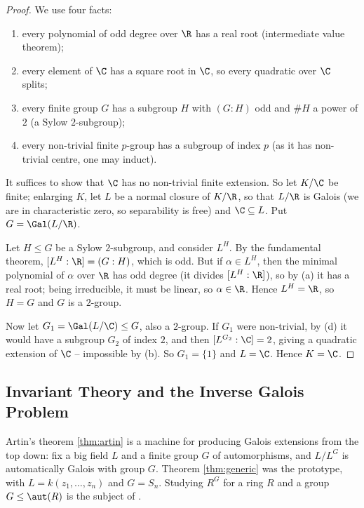 \begin{proof}
	We use four facts:
	\begin{enumerate}[label=(\alph*)]
		\item every polynomial of odd degree over $\R$ has a real root (intermediate value theorem);
		\item every element of $\C$ has a square root in $\C$, so every quadratic over $\C$ splits;
		\item every finite group $G$ has a subgroup $H$ with $(G:H)$ odd and $\#H$ a power of $2$ (a Sylow $2$-subgroup);
		\item every non-trivial finite $p$-group has a subgroup of index $p$ (as it has non-trivial centre, one may induct).
	\end{enumerate}

	It suffices to show that $\C$ has no non-trivial finite extension. So let $K/\C$ be finite; enlarging $K$, let $L$ be a normal closure of $K/\R$, so that $L/\R$ is Galois (we are in characteristic zero, so separability is free) and $\C \subseteq L$. Put $G = \Gal(L/\R)$.

	Let $H \leq G$ be a Sylow $2$-subgroup, and consider $L^H$. By the fundamental theorem, $[L^H:\R] = (G:H)$, which is odd. But if $\alpha \in L^H$, then the minimal polynomial of $\alpha$ over $\R$ has odd degree (it divides $[L^H : \R]$), so by (a) it has a real root; being irreducible, it must be linear, so $\alpha \in \R$. Hence $L^H = \R$, so $H = G$ and $G$ is a $2$-group.

	Now let $G_1 = \Gal(L/\C) \leq G$, also a $2$-group. If $G_1$ were non-trivial, by (d) it would have a subgroup $G_2$ of index $2$, and then $[L^{G_2}:\C] = 2$, giving a quadratic extension of $\C$ -- impossible by (b). So $G_1 = \{1\}$ and $L = \C$. Hence $K = \C$.
\end{proof}

\subsection{Invariant Theory and the Inverse Galois Problem}

Artin's theorem \ref{thm:artin} is a machine for producing Galois extensions from the top down: fix a big field $L$ and a finite group $G$ of automorphisms, and $L/L^G$ is automatically Galois with group $G$. Theorem \ref{thm:generic} was the prototype, with $L = k(z_1,\dots,z_n)$ and $G = S_n$. Studying $R^G$ for a ring $R$ and a group $G \leq \aut(R)$ is the subject of .

